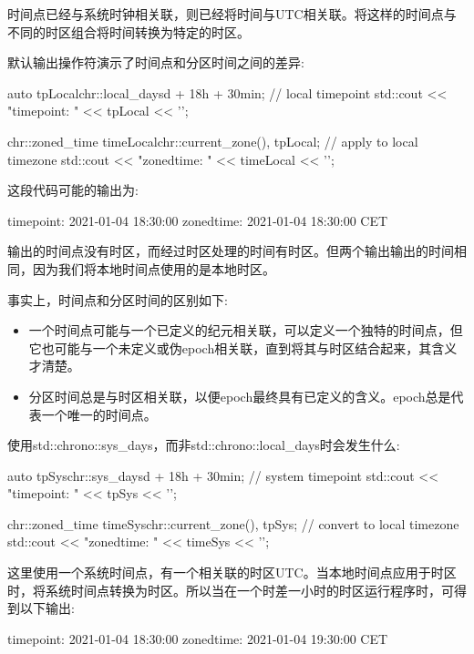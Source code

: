 时间点已经与系统时钟相关联，则已经将时间与UTC相关联。将这样的时间点与不同的时区组合将时间转换为特定的时区。

默认输出操作符演示了时间点和分区时间之间的差异:

\begin{cpp}
auto tpLocal{chr::local_days{d} + 18h + 30min}; // local timepoint
std::cout << "timepoint: " << tpLocal << '\n';

chr::zoned_time timeLocal{chr::current_zone(), tpLocal}; // apply to local timezone
std::cout << "zonedtime: " << timeLocal << '\n';
\end{cpp}

这段代码可能的输出为:

\begin{shell}
timepoint: 2021-01-04 18:30:00
zonedtime: 2021-01-04 18:30:00 CET
\end{shell}

输出的时间点没有时区，而经过时区处理的时间有时区。但两个输出输出的时间相同，因为我们将本地时间点使用的是本地时区。

事实上，时间点和分区时间的区别如下:

\begin{itemize}
\item
一个时间点可能与一个已定义的纪元相关联，可以定义一个独特的时间点，但它也可能与一个未定义或伪epoch相关联，直到将其与时区结合起来，其含义才清楚。

\item
分区时间总是与时区相关联，以便epoch最终具有已定义的含义。epoch总是代表一个唯一的时间点。
\end{itemize}

使用std::chrono::sys\_days，而非std::chrono::local\_days时会发生什么:

\begin{cpp}
auto tpSys{chr::sys_days{d} + 18h + 30min}; // system timepoint
std::cout << "timepoint: " << tpSys << '\n';

chr::zoned_time timeSys{chr::current_zone(), tpSys}; // convert to local timezone
std::cout << "zonedtime: " << timeSys << '\n';
\end{cpp}

这里使用一个系统时间点，有一个相关联的时区UTC。当本地时间点应用于时区时，将系统时间点转换为时区。所以当在一个时差一小时的时区运行程序时，可得到以下输出:

\begin{shell}
timepoint: 2021-01-04 18:30:00
zonedtime: 2021-01-04 19:30:00 CET
\end{shell}

